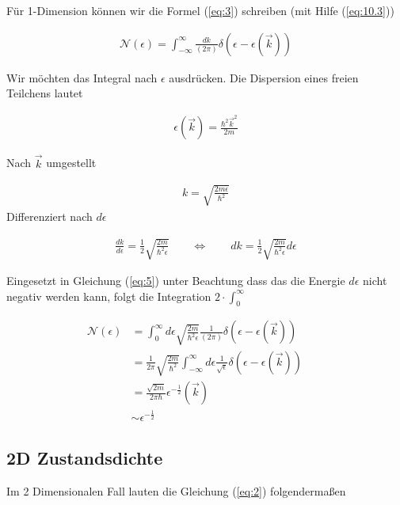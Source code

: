 Für 1-Dimension können wir die Formel (\ref{eq:3}) schreiben (mit Hilfe (\ref{eq:10.3}))

\begin{align}
  \label{eq:5}
  \mathcal N(\epsilon) =  \int_{-\infty}^{\infty} \frac{d k}{(2\pi)} \delta(\epsilon - \epsilon(\vec k))
\end{align}

Wir möchten das Integral nach \(\epsilon\) ausdrücken. Die Dispersion eines freien Teilchens lautet

\begin{align}
  \label{eq:6}
  \epsilon(\vec k) = \frac{\hbar^2 \vec k^2}{2m} 
\end{align}

Nach \(\vec k\) umgestellt

\begin{align}
  \label{eq:7}
  k = \sqrt{\frac{2m \epsilon}{\hbar^2}}
\end{align}
Differenziert nach \(d\epsilon\)

\begin{align}
  \label{eq:8}
  \frac{d k}{d\epsilon} = \frac{1}{2} \sqrt{\frac{2m}{\hbar^2  \epsilon}} \qquad \Leftrightarrow \qquad dk = \frac{1}{2} \sqrt{\frac{2m}{\hbar^2  \epsilon}} d\epsilon
\end{align}

Eingesetzt in Gleichung (\ref{eq:5}) unter Beachtung dass das die Energie \(d\epsilon\) nicht negativ werden kann, folgt die Integration \(2\cdot\int_{0}^\infty\)

\begin{align}
  \label{eq:9}
   \mathcal N(\epsilon) &= \int_{0}^{\infty} d\epsilon  \sqrt{\frac{2m}{\hbar^2  \epsilon}}  \frac{ 1}{(2\pi)} \delta(\epsilon - \epsilon(\vec k)) \qquad \\
 &= \frac{1}{2\pi} \sqrt{\frac{2m}{\hbar^2}} \int_{-\infty}^{\infty} d\epsilon \frac{1}{\sqrt{\epsilon}}   \delta(\epsilon - \epsilon(\vec k)) \qquad \\
 &= \frac{\sqrt{2m}}{2\pi\hbar}  \epsilon^{-\frac{1}{2}}(\vec k)  \qquad \\
&\sim \epsilon^{-\frac{1}{2}}
\end{align}

\subsection*{2D Zustandsdichte}

Im 2 Dimensionalen Fall lauten die Gleichung (\ref{eq:2}) folgendermaßen

